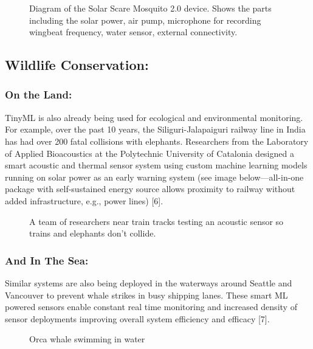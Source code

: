 \begin{figure}
    \caption{Diagram of the Solar Scare Mosquito 2.0 device. Shows the parts including the solar power, air pump, microphone for recording wingbeat frequency, water sensor, external connectivity.}
\end{figure}  




\subsection{Wildlife Conservation:}

\subsubsection{On the Land:}

TinyML is also already being used for ecological and environmental monitoring. For example, over the past 10 years, the Siliguri-Jalapaiguri railway line in India has had over 200 fatal collisions with elephants. Researchers from the Laboratory of Applied Bioacoustics at the Polytechnic University of Catalonia designed a smart acoustic and thermal sensor system using custom machine learning models running on solar power as an early warning system (see image below—all-in-one package with self-sustained energy source allows proximity to railway without added infrastructure, e.g., power lines) [6].

\begin{figure}
    \caption{A team of researchers near train tracks testing an acoustic sensor so trains and elephants don't collide.}
\end{figure}  



\subsubsection{And In The Sea:}

Similar systems are also being deployed in the waterways around Seattle and Vancouver to prevent whale strikes in busy shipping lanes. These smart ML powered sensors enable constant real time monitoring and increased density of sensor deployments improving overall system efficiency and efficacy [7].

\begin{figure}
    \caption{Orca whale swimming in water}
\end{figure}  







